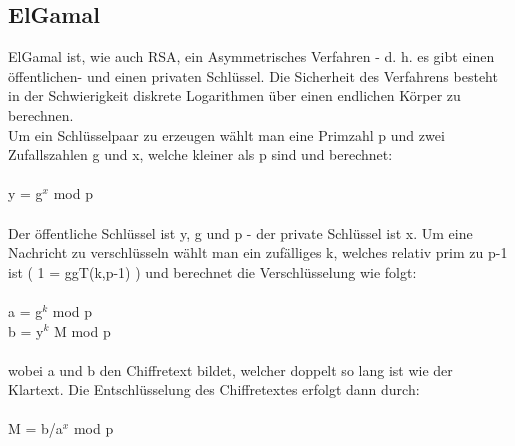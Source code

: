 \documentclass[10pt, a4paper]{scrreprt}
\begin{document}
\subsection{ElGamal}
ElGamal ist, wie auch RSA, ein Asymmetrisches Verfahren - d. h. es gibt einen öffentlichen- und einen privaten Schlüssel. Die Sicherheit des Verfahrens besteht in der Schwierigkeit diskrete Logarithmen über einen endlichen Körper zu berechnen. \\
Um ein Schlüsselpaar zu erzeugen wählt man eine Primzahl p und zwei Zufallszahlen g und x, welche kleiner als p sind und berechnet: \\ \\
y = g$^{x}$ mod p \\ \\
Der öffentliche Schlüssel ist y, g und p - der private Schlüssel ist x. Um eine Nachricht zu verschlüsseln wählt man ein zufälliges k, welches relativ prim zu p-1 ist ( 1 = ggT(k,p-1) ) und berechnet die Verschlüsselung wie folgt: \\ \\
a = g$^{k}$ mod p \\
b = y$^{k}$ M mod p \\ \\
wobei a und b den Chiffretext bildet, welcher doppelt so lang ist wie der Klartext. Die Entschlüsselung des Chiffretextes erfolgt dann durch: \\ \\
M = b/a$^{x}$ mod p \\
\end{document}
